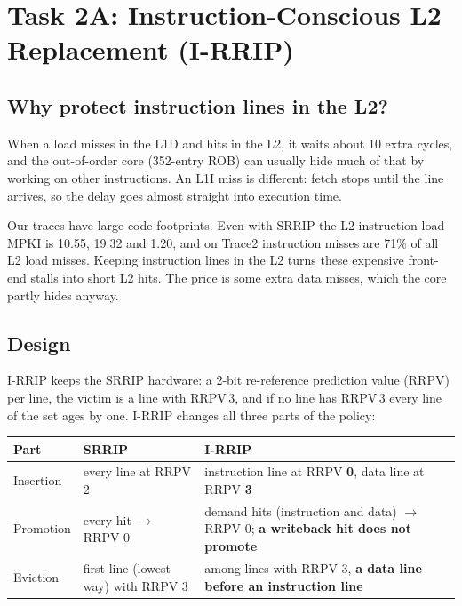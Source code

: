 \clearpage
\section{Task 2A: Instruction-Conscious L2 Replacement (I-RRIP)}

\subsection{Why protect instruction lines in the L2?}
When a load misses in the L1D and hits in the L2, it waits about 10 extra cycles, and the out-of-order core
(352-entry ROB) can usually hide much of that by working on other instructions. An L1I miss is different: fetch
stops until the line arrives, so the delay goes almost straight into execution time.

Our traces have large code footprints. Even with SRRIP the L2 instruction load MPKI is 10.55, 19.32 and 1.20, and
on Trace2 instruction misses are 71\% of all L2 load misses. Keeping instruction lines in the L2 turns these
expensive front-end stalls into short L2 hits. The price is some extra data misses, which the core partly hides anyway.

\subsection{Design}
I-RRIP keeps the SRRIP hardware: a 2-bit re-reference prediction value (RRPV) per line, the victim is a line with
RRPV\,3, and if no line has RRPV\,3 every line of the set ages by one. I-RRIP changes all three parts of the policy:

\begin{table}[H]\centering\small
\begin{tabularx}{\textwidth}{@{}l>{\raggedright\arraybackslash}p{40mm}>{\raggedright\arraybackslash}X@{}}
\toprule
Part & SRRIP & I-RRIP \\
\midrule
Insertion & every line at RRPV 2               & instruction line at RRPV \textbf{0}, data line at RRPV \textbf{3} \\
Promotion & every hit $\to$ RRPV 0             & demand hits (instruction and data) $\to$ RRPV 0; \textbf{a writeback hit does not promote} \\
Eviction  & first line (lowest way) with RRPV 3 & among lines with RRPV 3, \textbf{a data line before an instruction line} \\
\bottomrule
\end{tabularx}
\end{table}

